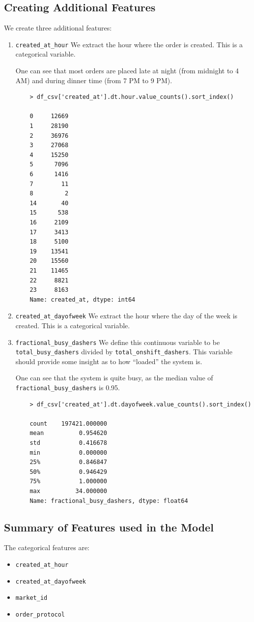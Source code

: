 \documentclass[12pt]{article}
\begin{document}
\subsection{Creating Additional Features}
We create three additional features:
\begin{enumerate}
  \item \texttt{created\_at\_hour} We extract the hour where the order is created.  This is a categorical variable.

  One can see that most orders are placed late at night (from midnight to 4 AM) and during dinner time (from 7 PM to 9 PM).
    \begin{verbatim}
    > df_csv['created_at'].dt.hour.value_counts().sort_index()

    0     12669
    1     28190
    2     36976
    3     27068
    4     15250
    5      7096
    6      1416
    7        11
    8         2
    14       40
    15      538
    16     2109
    17     3413
    18     5100
    19    13541
    20    15560
    21    11465
    22     8821
    23     8163
    Name: created_at, dtype: int64
    \end{verbatim}

  \item \texttt{created\_at\_dayofweek} We extract the hour where the day of the week is created.  This is a categorical variable.

  \item \texttt{fractional\_busy\_dashers} We define this continuous variable to be \texttt{total\_busy\_dashers} divided by \texttt{total\_onshift\_dashers}. This variable should provide some insight as to how ``loaded'' the system is.

  One can see that the system is quite busy, as the median value of \texttt{fractional\_busy\_dashers} is 0.95.

    \begin{verbatim}
    > df_csv['created_at'].dt.dayofweek.value_counts().sort_index()

    count    197421.000000
    mean          0.954620
    std           0.416678
    min           0.000000
    25%           0.846847
    50%           0.946429
    75%           1.000000
    max          34.000000
    Name: fractional_busy_dashers, dtype: float64
    \end{verbatim}

\end{enumerate}


\subsection{Summary of Features used in the Model}
The categorical features are:
\begin{itemize}
  \item \texttt{created\_at\_hour}
  \item \texttt{created\_at\_dayofweek}
  \item \texttt{market\_id}
  \item \texttt{order\_protocol}
\end{itemize}
\end{document}
